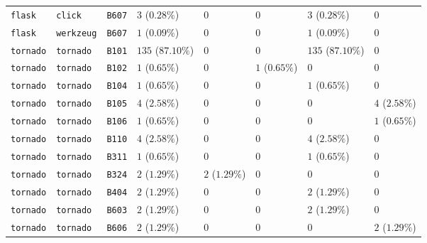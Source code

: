 \begin{table}
\begin{tabular}{llllllll}
\texttt{flask} & \texttt{click} & \texttt{B607} & $3$ ($0.28\%$) & $0$ & $0$ & $3$ ($0.28\%$) & $0$ \\
\texttt{flask} & \texttt{werkzeug} & \texttt{B607} & $1$ ($0.09\%$) & $0$ & $0$ & $1$ ($0.09\%$) & $0$ \\
\texttt{tornado} & \texttt{tornado} & \texttt{B101} & $135$ ($87.10\%$) & $0$ & $0$ & $135$ ($87.10\%$) & $0$ \\
\texttt{tornado} & \texttt{tornado} & \texttt{B102} & $1$ ($0.65\%$) & $0$ & $1$ ($0.65\%$) & $0$ & $0$ \\
\texttt{tornado} & \texttt{tornado} & \texttt{B104} & $1$ ($0.65\%$) & $0$ & $0$ & $1$ ($0.65\%$) & $0$ \\
\texttt{tornado} & \texttt{tornado} & \texttt{B105} & $4$ ($2.58\%$) & $0$ & $0$ & $0$ & $4$ ($2.58\%$) \\
\texttt{tornado} & \texttt{tornado} & \texttt{B106} & $1$ ($0.65\%$) & $0$ & $0$ & $0$ & $1$ ($0.65\%$) \\
\texttt{tornado} & \texttt{tornado} & \texttt{B110} & $4$ ($2.58\%$) & $0$ & $0$ & $4$ ($2.58\%$) & $0$ \\
\texttt{tornado} & \texttt{tornado} & \texttt{B311} & $1$ ($0.65\%$) & $0$ & $0$ & $1$ ($0.65\%$) & $0$ \\
\texttt{tornado} & \texttt{tornado} & \texttt{B324} & $2$ ($1.29\%$) & $2$ ($1.29\%$) & $0$ & $0$ & $0$ \\
\texttt{tornado} & \texttt{tornado} & \texttt{B404} & $2$ ($1.29\%$) & $0$ & $0$ & $2$ ($1.29\%$) & $0$ \\
\texttt{tornado} & \texttt{tornado} & \texttt{B603} & $2$ ($1.29\%$) & $0$ & $0$ & $2$ ($1.29\%$) & $0$ \\
\texttt{tornado} & \texttt{tornado} & \texttt{B606} & $2$ ($1.29\%$) & $0$ & $0$ & $0$ & $2$ ($1.29\%$) \\
\bottomrule
\end{tabular}
\end{table}
